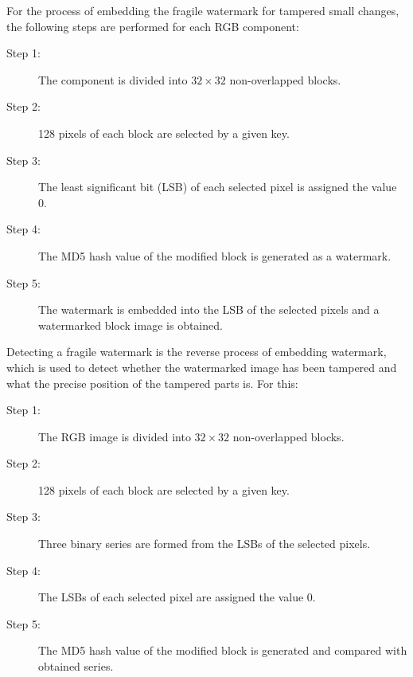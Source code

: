 \documentclass[runningheads]{llncs}
\begin{document}
For the process of embedding the fragile watermark for tampered small changes, the following steps are performed for each RGB component:
\begin{description}
	\item[Step 1:] The component is divided into $32\times 32$ non-overlapped blocks.
	\item[Step 2:] 128 pixels of each block are selected by a given key.
	\item[Step 3:] The least significant bit (LSB) of each selected pixel is assigned the value 0.
	\item[Step 4:] The MD5 hash value of the modified block is generated as a watermark.
	\item[Step 5:] The watermark is embedded into the LSB of the selected pixels and a watermarked block image is obtained.
\end{description}

Detecting a fragile watermark is the reverse process of embedding watermark, which is used to detect whether the watermarked image has been tampered and what the precise position of the tampered parts is. For this:
\begin{description}
	\item[Step 1:] The RGB image is divided into $32\times 32$ non-overlapped blocks.
	\item[Step 2:] 128 pixels of each block are selected by a given key.
	\item[Step 3:] Three binary series are formed from the LSBs of the selected pixels.
	\item[Step 4:] The LSBs of each selected pixel are assigned the value 0.
	\item[Step 5:] The MD5 hash value of the modified block is generated and compared with obtained series.
\end{description}
\end{document}
